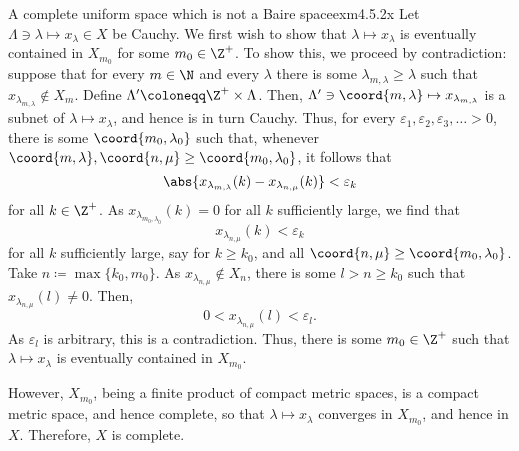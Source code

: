 \begin{exm}{A complete uniform space which is not a Baire space}{exm4.5.2x}
Let $\Lambda \ni \lambda \mapsto x_{\lambda}\in X$ be Cauchy.  We first wish to show that $\lambda \mapsto x_\lambda$ is eventually contained in $X_{m_0}$ for some $m_0\in \Z ^+$.  To show this, we proceed by contradiction:  suppose that for every $m\in \N$ and every $\lambda$ there is some $\lambda _{m,\lambda}\geq \lambda$ such that $x_{\lambda _{m,\lambda}}\notin X_m$.  Define $\Lambda '\coloneqq \Z ^+\times \Lambda$.  Then, $\Lambda '\ni \coord{m,\lambda}\mapsto x_{\lambda _{m,\lambda}}$ is a subnet of $\lambda \mapsto x_\lambda$, and hence is in turn Cauchy.  Thus, for every $\varepsilon _1,\varepsilon _2,\varepsilon _3,\ldots >0$, there is some $\coord{m_0,\lambda _0}$ such that, whenever $\coord{m,\lambda},\coord{n,\mu}\geq \coord{m_0,\lambda _0}$, it follows that
\begin{equation}
\abs{x_{\lambda _{m,\lambda}}(k)-x_{\lambda _{n,\mu}}(k)}<\varepsilon _k
\end{equation}
for all $k\in \Z ^+$.  As $x_{\lambda _{m_0,\lambda _0}}(k)=0$ for all $k$ sufficiently large, we find that
\begin{equation}
x_{\lambda _{n,\mu}}(k)<\varepsilon _k
\end{equation}
for all $k$ sufficiently large, say for $k\geq k_0$, and all $\coord{n,\mu}\geq \coord{m_0,\lambda _0}$.  Take $n\coloneqq \max \{ k_0,m_0\}$.  As $x_{\lambda _{n,\mu}}\notin X_n$, there is some $l>n\geq k_0$ such that $x_{\lambda _{n,\mu}}(l)\neq 0$.  Then,
\begin{equation}
0<x_{\lambda _{n,\mu}}(l)<\varepsilon _l.
\end{equation}
As $\varepsilon _l$ is arbitrary, this is a contradiction.  Thus, there is some $m_0\in \Z ^+$ such that $\lambda \mapsto x_\lambda$ is eventually contained in $X_{m_0}$.

However, $X_{m_0}$, being a finite product of compact metric spaces, is a compact metric space, and hence complete, so that $\lambda \mapsto x_\lambda$ converges in $X_{m_0}$, and hence in $X$.  Therefore, $X$ is complete.


\end{exm}
